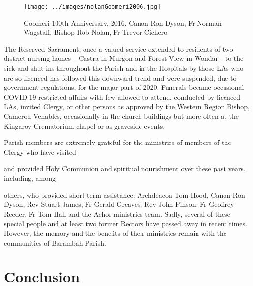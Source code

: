 \begin{figure}[!htb]
\begin{center}
\texttt{[image: ../images/nolanGoomeri2006.jpg]}
\caption{Goomeri 100th Anniversary, 2016. Canon Ron Dyson, Fr Norman Wagstaff, Bishop Rob Nolan, Fr Trevor Cichero}
\end{center}
\end{figure}




The Reserved Sacrament, once a valued service extended to residents of two district nursing homes -- Castra in Murgon and Forest View in Wondai -- to the sick and shut-ins throughout the Parish and in the Hospitals by those LAs who are so licenced has followed this downward trend and were suspended, due to government regulations, for the major part of 2020. Funerals became occasional COVID 19 restricted affairs with few allowed to attend, conducted by licenced LAs, invited Clergy, or other persons as approved by the Western Region Bishop, Cameron Venables, occasionally in the church buildings but more often at the Kingaroy Crematorium chapel or as graveside events.



Parish members are extremely grateful for the ministries of members of the Clergy who have visited



and provided Holy Communion and spiritual nourishment over these past years, including, among



others, who provided short term assistance: Archdeacon Tom Hood, Canon Ron Dyson, Rev Stuart James, Fr Gerald Greaves, Rev John Pinson, Fr Geoffrey Reeder. Fr Tom Hall and the Achor ministries team\emph{.} Sadly, several of these special people and at least two former Rectors have passed away in recent times. However, the memory and the benefits of their ministries remain with the communities of Barambah Parish.



\balance


\printendnotes[custom]
\setcounter{endnote}{0}
\chapter{Conclusion}
\nobalance


